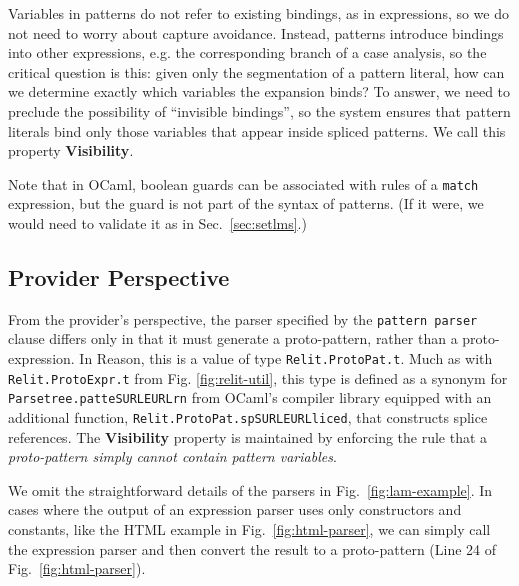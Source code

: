 \documentclass[acmsmall]{acmart}
\newcommand{\li}[1]{\lstinline[basicstyle=\ttfamily\fontsize{9pt}{1em}\selectfont]{#1}}
\begin{document}
Variables in patterns do not refer to existing bindings, as in expressions, so we do not need to worry about capture avoidance. Instead, patterns introduce bindings into other expressions, e.g. the corresponding branch of a case analysis, so the critical question is this: given only the segmentation of a pattern literal, how can we determine exactly which variables the expansion binds? To answer, we need to preclude the possibility of ``invisible bindings'', so the system ensures that pattern literals bind only those variables that appear inside spliced patterns. We call this property \textbf{Visibility}. 

Note that in OCaml, boolean guards can be associated with rules of a \li{match} expression, but the guard is not part of the syntax of patterns. (If it were, we would need to validate it as in Sec.~\ref{sec:setlms}.) %

\subsection{Provider Perspective}
From the provider's perspective, the parser specified by the \li{pattern parser} clause differs only in that it must generate a proto-pattern, rather than a proto-expression. In Reason, this is a value of type \li{Relit.ProtoPat.t}. Much as with \li{Relit.ProtoExpr.t} from Fig. \ref{fig:relit-util}, this type is defined as a synonym for \li{Parsetree.patteSURLEURLrn} from OCaml's compiler library equipped with an additional function, \li{Relit.ProtoPat.spSURLEURLliced}, that constructs splice references. The \textbf{Visibility} property is maintained by enforcing the rule that a \emph{proto-pattern simply cannot contain pattern variables}.

We omit the straightforward details of the parsers in Fig.~\ref{fig:lam-example}. In cases where the output of an expression parser uses only constructors and constants, like the HTML example in Fig.~\ref{fig:html-parser}, we can simply call the expression parser and then convert the result to a proto-pattern (Line 24 of Fig.~\ref{fig:html-parser}). %
\end{document}
